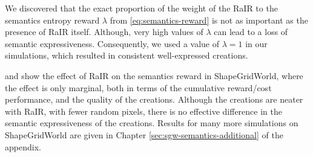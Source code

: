 We discovered that the exact proportion of the weight of the RaIR to the semantics entropy reward \(\lambda\) from \eqref{eq:semantics-reward} is not as important as the presence of RaIR itself.
Although, very high values of \(\lambda\) can lead to a loss of semantic expressiveness.
Consequently, we used a value of \(\lambda = 1\) in our simulations, which resulted in consistent well-expressed creations.

 and  show the effect of RaIR on the semantics reward in ShapeGridWorld, where the effect is only marginal, both in terms of the cumulative reward/cost performance, and the quality of the creations.
Although the creations are neater with RaIR, with fewer random pixels, there is no effective difference in the semantic expressiveness of the creations.
Results for many more simulations on ShapeGridWorld are given in Chapter \ref{sec:sgw-semantics-additional} of the appendix.

